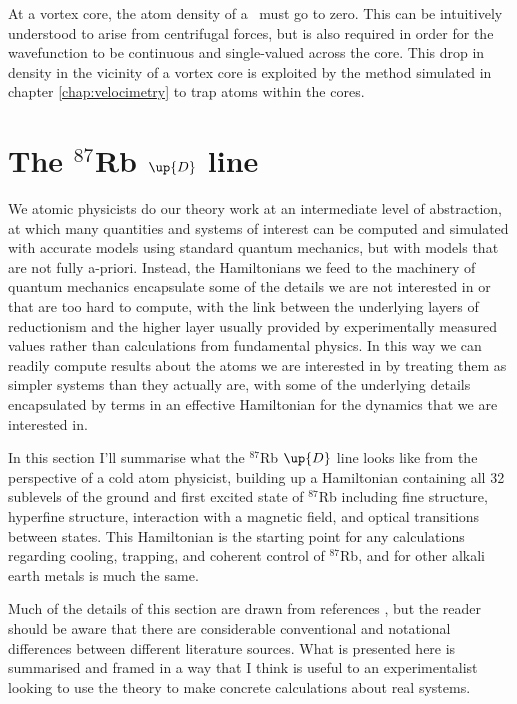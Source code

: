 At a vortex core, the atom density of a \bec\ must go to zero. This can be intuitively understood to arise from centrifugal forces, but is also required in order for the wavefunction to be continuous and single-valued across the core. This drop in density in the vicinity of a vortex core is exploited by the method simulated in chapter \ref{chap:velocimetry} to trap atoms within the cores.

\section{The $^{87}$Rb $\up{D}$ line}\label{sec:the_rubidium_D_line}

We atomic physicists do our theory work at an intermediate level of abstraction, at which many quantities and systems of interest can be computed and simulated with accurate models using standard quantum mechanics, but with models that are not fully a-priori. Instead, the Hamiltonians we feed to the machinery of quantum mechanics encapsulate some of the details we are not interested in or that are too hard to compute, with the link between the underlying layers of reductionism and the higher layer usually provided by experimentally measured values rather than calculations from fundamental physics. In this way we can readily compute results about the atoms we are interested in by treating them as simpler systems than they actually are, with some of the underlying details encapsulated by terms in an effective Hamiltonian for the dynamics that we are interested in.

In this section I'll summarise what the $^{87}$Rb $\up{D}$ line looks like from the perspective of a cold atom physicist, building up a Hamiltonian containing all 32 sublevels of the ground and first excited state of $^{87}$Rb including fine structure, hyperfine structure, interaction with a magnetic field, and optical transitions between states. This Hamiltonian is the starting point for any calculations regarding cooling, trapping, and coherent control of $^{87}$Rb, and for other alkali earth metals is much the same.

Much of the details of this section are drawn from references \cite{steck_rubidium_2015, steck_quantum_2017, metcalf_laser_1999, king_angular_2008, farrell_consistency_1995}, but the reader should be aware that there are considerable conventional and notational differences between different literature sources. What is presented here is summarised and framed in a way that I think is useful to an experimentalist looking to use the theory to make concrete calculations about real systems.

